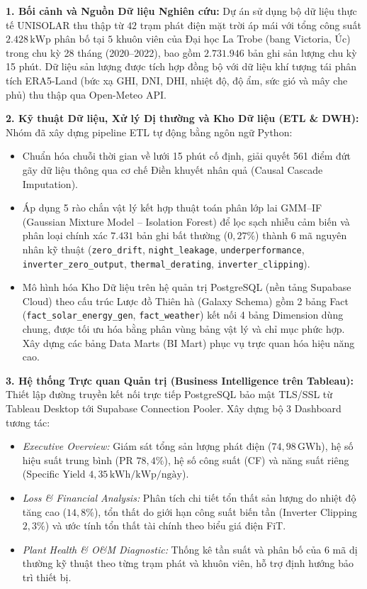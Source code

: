 \documentclass[12pt, a4paper]{report}
\begin{document}
\textbf{1. Bối cảnh và Nguồn Dữ liệu Nghiên cứu:}
Dự án sử dụng bộ dữ liệu thực tế UNISOLAR thu thập từ $42$ trạm phát điện mặt trời áp mái với tổng công suất $2.428\,\text{kWp}$ phân bố tại $5$ khuôn viên của Đại học La Trobe (bang Victoria, Úc) trong chu kỳ 28 tháng (2020--2022), bao gồm $2.731.946$ bản ghi sản lượng chu kỳ 15 phút. Dữ liệu sản lượng được tích hợp đồng bộ với dữ liệu khí tượng tái phân tích ERA5-Land (bức xạ GHI, DNI, DHI, nhiệt độ, độ ẩm, sức gió và mây che phủ) thu thập qua Open-Meteo API.

\textbf{2. Kỹ thuật Dữ liệu, Xử lý Dị thường và Kho Dữ liệu (ETL \& DWH):}
Nhóm đã xây dựng pipeline ETL tự động bằng ngôn ngữ Python:
\begin{itemize}[noitemsep]
    \item Chuẩn hóa chuỗi thời gian về lưới 15 phút cố định, giải quyết 561 điểm đứt gãy dữ liệu thông qua cơ chế Điền khuyết nhân quả (Causal Cascade Imputation).
    \item Áp dụng 5 rào chắn vật lý kết hợp thuật toán phân lớp lai GMM--IF (Gaussian Mixture Model -- Isolation Forest) để lọc sạch nhiễu cảm biến và phân loại chính xác $7.431$ bản ghi bất thường ($0{,}27\%$) thành 6 mã nguyên nhân kỹ thuật (\texttt{zero\_drift}, \texttt{night\_leakage}, \texttt{underperformance}, \texttt{inverter\_zero\_output}, \texttt{thermal\_derating}, \texttt{inverter\_clipping}).
    \item Mô hình hóa Kho Dữ liệu trên hệ quản trị PostgreSQL (nền tảng Supabase Cloud) theo cấu trúc Lược đồ Thiên hà (Galaxy Schema) gồm 2 bảng Fact (\texttt{fact\_solar\_energy\_gen}, \texttt{fact\_weather}) kết nối 4 bảng Dimension dùng chung, được tối ưu hóa bằng phân vùng bảng vật lý và chỉ mục phức hợp. Xây dựng các bảng Data Marts (BI Mart) phục vụ trực quan hóa hiệu năng cao.
\end{itemize}

\textbf{3. Hệ thống Trực quan Quản trị (Business Intelligence trên Tableau):}
Thiết lập đường truyền kết nối trực tiếp PostgreSQL bảo mật TLS/SSL từ Tableau Desktop tới Supabase Connection Pooler. Xây dựng bộ 3 Dashboard tương tác:
\begin{itemize}[noitemsep]
    \item \textit{Executive Overview:} Giám sát tổng sản lượng phát điện ($74{,}98\,\text{GWh}$), hệ số hiệu suất trung bình (PR $78{,}4\%$), hệ số công suất (CF) và năng suất riêng (Specific Yield $4{,}35\,\text{kWh/kWp/ngày}$).
    \item \textit{Loss \& Financial Analysis:} Phân tích chi tiết tổn thất sản lượng do nhiệt độ tăng cao ($14{,}8\%$), tổn thất do giới hạn công suất biến tần (Inverter Clipping $2{,}3\%$) và ước tính tổn thất tài chính theo biểu giá điện FiT.
    \item \textit{Plant Health \& O\&M Diagnostic:} Thống kê tần suất và phân bố của 6 mã dị thường kỹ thuật theo từng trạm phát và khuôn viên, hỗ trợ định hướng bảo trì thiết bị.
\end{itemize}
\end{document}
